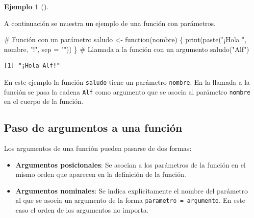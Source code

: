 \documentclass[
  a4paper,
]{scrreport}
\newenvironment{Shaded}{\begin{snugshade}}{\end{snugshade}}
\newcommand{\AttributeTok}[1]{\textcolor[rgb]{0.40,0.45,0.13}{#1}}
\newcommand{\CommentTok}[1]{\textcolor[rgb]{0.37,0.37,0.37}{#1}}
\newcommand{\ControlFlowTok}[1]{\textcolor[rgb]{0.00,0.23,0.31}{#1}}
\newcommand{\FunctionTok}[1]{\textcolor[rgb]{0.28,0.35,0.67}{#1}}
\newcommand{\NormalTok}[1]{\textcolor[rgb]{0.00,0.23,0.31}{#1}}
\newcommand{\OtherTok}[1]{\textcolor[rgb]{0.00,0.23,0.31}{#1}}
\newcommand{\StringTok}[1]{\textcolor[rgb]{0.13,0.47,0.30}{#1}}
\providecommand{\tightlist}{%
  \setlength{\itemsep}{0pt}\setlength{\parskip}{0pt}}\usepackage{longtable,booktabs,array}
\theoremstyle{definition}
\newtheorem{example}{Ejemplo}[chapter]
\theoremstyle{definition}
\theoremstyle{remark}
\begin{document}
\leavevmode{}%
\begin{example}[]\label{exm-funcion-con-parametros}

A continuación se muestra un ejemplo de una función con parámetros.

\begin{Shaded}
\begin{Highlighting}[]
\CommentTok{\# Función con un parámetro}
\NormalTok{saludo }\OtherTok{\textless{}{-}} \ControlFlowTok{function}\NormalTok{(nombre) \{}
  \FunctionTok{print}\NormalTok{(}\FunctionTok{paste}\NormalTok{(}\StringTok{"¡Hola "}\NormalTok{, nombre, }\StringTok{"!"}\NormalTok{, }\AttributeTok{sep =} \StringTok{""}\NormalTok{))}
\NormalTok{\}}
\CommentTok{\# Llamada a la función con un argumento}
\FunctionTok{saludo}\NormalTok{(}\StringTok{"Alf"}\NormalTok{)}
\end{Highlighting}
\end{Shaded}

\begin{verbatim}
[1] "¡Hola Alf!"
\end{verbatim}

En este ejemplo la función \texttt{saludo} tiene un parámetro
\texttt{nombre}. En la llamada a la función se pasa la cadena
\texttt{Alf} como argumento que se asocia al parámetro \texttt{nombre}
en el cuerpo de la función.

\end{example}

\hypertarget{paso-de-argumentos-a-una-funciuxf3n}{%
\subsection{Paso de argumentos a una
función}\label{paso-de-argumentos-a-una-funciuxf3n}}

Los argumentos de una función pueden pasarse de dos formas:

\begin{itemize}
\tightlist
\item
  \textbf{Argumentos posicionales}: Se asocian a los parámetros de la
  función en el mismo orden que aparecen en la definición de la función.
\item
  \textbf{Argumentos nominales}: Se indica explícitamente el nombre del
  parámetro al que se asocia un argumento de la forma
  \texttt{parametro\ =\ argumento}. En este caso el orden de los
  argumentos no importa.
\end{itemize}
\end{document}
